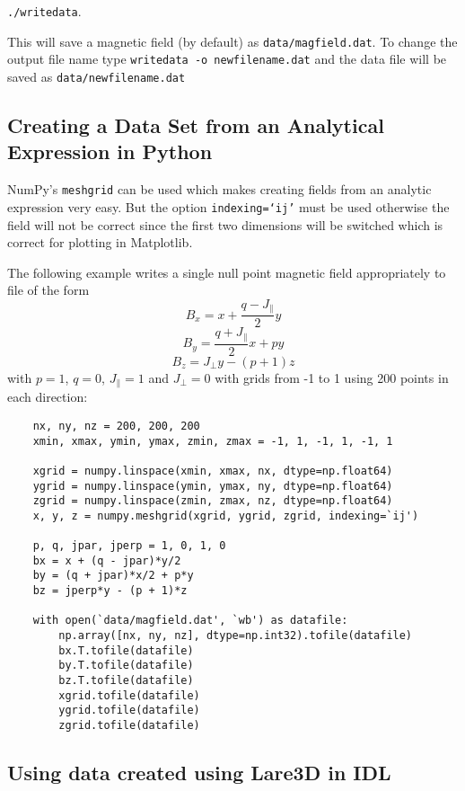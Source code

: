\documentclass[12pt]{article}
\begin{document}
      \texttt{./writedata}.

      This will save a magnetic field (by default) as \texttt{data/magfield.dat}. To change the output file name type \texttt{writedata -o newfilename.dat} and the data file will be saved as \texttt{data/newfilename.dat}
    
    \subsection{Creating a Data Set from an Analytical Expression in Python}
      \label{sec:pythonanal}

      NumPy's \texttt{meshgrid} can be used which makes creating fields from an analytic expression very easy. But the option \texttt{indexing=`ij'} must be used otherwise the field will not be correct since the first two dimensions will be switched which is correct for plotting in Matplotlib.

      The following example writes a single null point magnetic field appropriately to file of the form
        \[ B_x = x + \frac{q - J_\parallel}{2} y \]
        \[ B_y = \frac{q + J_\parallel}{2} x + p y \]
        \[ B_z = J_\perp y - (p + 1) z \]
      with \( p = 1 \), \( q = 0 \), \( J_\parallel = 1 \) and \( J_\perp = 0 \) with grids from -1 to 1 using 200 points in each direction:

      \begin{verbatim}
    nx, ny, nz = 200, 200, 200
    xmin, xmax, ymin, ymax, zmin, zmax = -1, 1, -1, 1, -1, 1

    xgrid = numpy.linspace(xmin, xmax, nx, dtype=np.float64)
    ygrid = numpy.linspace(ymin, ymax, ny, dtype=np.float64)
    zgrid = numpy.linspace(zmin, zmax, nz, dtype=np.float64)
    x, y, z = numpy.meshgrid(xgrid, ygrid, zgrid, indexing=`ij')

    p, q, jpar, jperp = 1, 0, 1, 0
    bx = x + (q - jpar)*y/2
    by = (q + jpar)*x/2 + p*y
    bz = jperp*y - (p + 1)*z

    with open(`data/magfield.dat', `wb') as datafile:
        np.array([nx, ny, nz], dtype=np.int32).tofile(datafile)
        bx.T.tofile(datafile)
        by.T.tofile(datafile)
        bz.T.tofile(datafile)
        xgrid.tofile(datafile)
        ygrid.tofile(datafile)
        zgrid.tofile(datafile)
      \end{verbatim}

    \subsection{Using data created using Lare3D in IDL}
\end{document}
